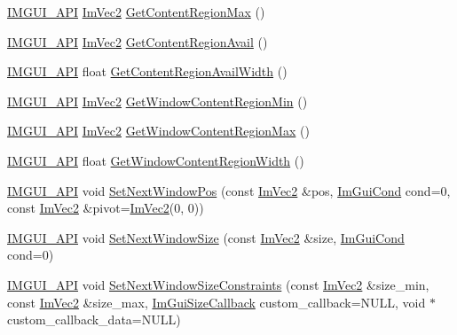 \begin{DoxyCompactItemize}
\item 
\mbox{\hyperlink{imgui_8h_a43829975e84e45d1149597467a14bbf5}{I\+M\+G\+U\+I\+\_\+\+A\+PI}} \mbox{\hyperlink{struct_im_vec2}{Im\+Vec2}} \mbox{\hyperlink{namespace_im_gui_a0a4dbfabbfa45d74319ef541962ce2eb}{Get\+Content\+Region\+Max}} ()
\item 
\mbox{\hyperlink{imgui_8h_a43829975e84e45d1149597467a14bbf5}{I\+M\+G\+U\+I\+\_\+\+A\+PI}} \mbox{\hyperlink{struct_im_vec2}{Im\+Vec2}} \mbox{\hyperlink{namespace_im_gui_a410c8e19b2fea8b52746ca11b3930301}{Get\+Content\+Region\+Avail}} ()
\item 
\mbox{\hyperlink{imgui_8h_a43829975e84e45d1149597467a14bbf5}{I\+M\+G\+U\+I\+\_\+\+A\+PI}} float \mbox{\hyperlink{namespace_im_gui_a52e3311f46626a5d0369139d20da993a}{Get\+Content\+Region\+Avail\+Width}} ()
\item 
\mbox{\hyperlink{imgui_8h_a43829975e84e45d1149597467a14bbf5}{I\+M\+G\+U\+I\+\_\+\+A\+PI}} \mbox{\hyperlink{struct_im_vec2}{Im\+Vec2}} \mbox{\hyperlink{namespace_im_gui_a790123aa15c266798f35050ba36b7197}{Get\+Window\+Content\+Region\+Min}} ()
\item 
\mbox{\hyperlink{imgui_8h_a43829975e84e45d1149597467a14bbf5}{I\+M\+G\+U\+I\+\_\+\+A\+PI}} \mbox{\hyperlink{struct_im_vec2}{Im\+Vec2}} \mbox{\hyperlink{namespace_im_gui_a96ce6060592d3ef975594357e650adc6}{Get\+Window\+Content\+Region\+Max}} ()
\item 
\mbox{\hyperlink{imgui_8h_a43829975e84e45d1149597467a14bbf5}{I\+M\+G\+U\+I\+\_\+\+A\+PI}} float \mbox{\hyperlink{namespace_im_gui_a87c1de99e670bff87c43bfb07bbf898f}{Get\+Window\+Content\+Region\+Width}} ()
\item 
\mbox{\hyperlink{imgui_8h_a43829975e84e45d1149597467a14bbf5}{I\+M\+G\+U\+I\+\_\+\+A\+PI}} void \mbox{\hyperlink{namespace_im_gui_afbccd31113430670b5ab2bf0d6f509bf}{Set\+Next\+Window\+Pos}} (const \mbox{\hyperlink{struct_im_vec2}{Im\+Vec2}} \&pos, \mbox{\hyperlink{imgui_8h_aef890d6ac872e12c5804d0b3e4f7f103}{Im\+Gui\+Cond}} cond=0, const \mbox{\hyperlink{struct_im_vec2}{Im\+Vec2}} \&pivot=\mbox{\hyperlink{struct_im_vec2}{Im\+Vec2}}(0, 0))
\item 
\mbox{\hyperlink{imgui_8h_a43829975e84e45d1149597467a14bbf5}{I\+M\+G\+U\+I\+\_\+\+A\+PI}} void \mbox{\hyperlink{namespace_im_gui_ab33717bb71ef5e393ae18656fc6b229d}{Set\+Next\+Window\+Size}} (const \mbox{\hyperlink{struct_im_vec2}{Im\+Vec2}} \&size, \mbox{\hyperlink{imgui_8h_aef890d6ac872e12c5804d0b3e4f7f103}{Im\+Gui\+Cond}} cond=0)
\item 
\mbox{\hyperlink{imgui_8h_a43829975e84e45d1149597467a14bbf5}{I\+M\+G\+U\+I\+\_\+\+A\+PI}} void \mbox{\hyperlink{namespace_im_gui_a157d5bcc362951e77eb3236864e879ce}{Set\+Next\+Window\+Size\+Constraints}} (const \mbox{\hyperlink{struct_im_vec2}{Im\+Vec2}} \&size\+\_\+min, const \mbox{\hyperlink{struct_im_vec2}{Im\+Vec2}} \&size\+\_\+max, \mbox{\hyperlink{imgui_8h_a1cccf55557c2153a9d4af6db73dc3a91}{Im\+Gui\+Size\+Callback}} custom\+\_\+callback=N\+U\+LL, void $\ast$custom\+\_\+callback\+\_\+data=N\+U\+LL)

\end{DoxyCompactItemize}
